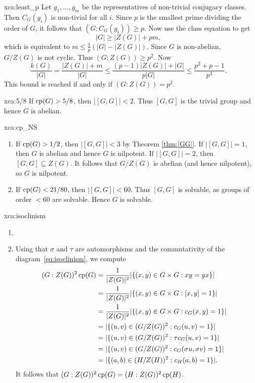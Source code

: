 \begin{sol}{xca:least_p}
Let $g_1,\dots,g_m$ be the representatives of non-trivial conjugacy classes. Then $C_G(g_i)$ is non-tivial for all $i$. Since $p$ is the smallest prime dividing the order of $G$, it follows that
$(G:C_G(g_i))\geq p$. Now use the class equation to get
\[
|G|\geq |Z(G)|+pm,
\]
which is equivalent to $m\leq \frac1p (|G|-|Z(G)|)$. Since $G$ is non-abelian, $G/Z(G)$ is not cyclic. Thus $(G:Z(G))\geq p^2$. Now 
\[
\frac{k(G)}{|G|}=\frac{|Z(G)|+m}{|G|}\leq \frac{(p-1)|Z(G)|+|G|}{p|G|}\leq \frac{p^2+p-1}{p^3}.
\]
This bound is reached if and only if $(G:Z(G))=p^2$.  
\end{sol}


\begin{sol}{xca:5/8}
    If $\operatorname{cp}(G)>5/8$, then $|[G,G]|<2$. Thus $[G,G]$ is the trivial group
    and hence $G$ is abelian. 
\end{sol}

\begin{sol}{xca:cp_NS}\
\begin{enumerate}
    \item If $\operatorname{cp}(G)>1/2$, then $|[G,G]|<3$ by Theorem \ref{thm:[GG]}. If $|[G,G]|=1$, 
    then $G$ is abelian and hence $G$ is nilpotent. If $|[G,G]|=2$, then 
    $[G,G]\subseteq Z(G)$. 
    It follows that 
    $G/Z(G)$ is abelian (and hence nilpotent), so $G$ is nilpotent. 
    \item If $\operatorname{cp}(G)<21/80$, then 
    $|[G,G]|<60$. Thus $[G,G]$ is solvable, as groups of order $<60$ are solvable. 
    Hence $G$ is solvable. 
\end{enumerate}
\end{sol}


\begin{sol}{xca:isoclinism}\
\begin{enumerate}
    \item 
    \item Using that $\sigma$ and 
    $\tau$ are automorphisms and 
    the commutativity of the diagram~\eqref{eq:isoclinism}, 
    we compute 
    \begin{align*}
        (G:Z(G))^2\operatorname{cp}(G) &= \frac{1}{|Z(G)|^2}|\{(x,y)\in G\times G:xy=yx\}|\\
        &=\frac{1}{|Z(G)|^2}|\{(x,y)\in G\times G:[x,y]=1\}|\\
        &=\frac{1}{|Z(G)|^2}|\{(x,y)\in G\times G:c_G(x,y)=1\}|\\
        &=|\{(u,v)\in (G/Z(G))^2:c_G(u,v)=1\}|\\
        &=|\{(u,v)\in (G/Z(G))^2:\tau c_G(u,v)=1\}|\\
        &=|\{(u,v)\in (G/Z(G))^2:c_G(\sigma u,\sigma v)=1\}|\\
        &=|\{(a,b)\in (H/Z(H))^2:c_H(a,b)=1\}|.
    \end{align*}
    It follows that $(G:Z(G))^2\operatorname{cp}(G)=(H:Z(G))^2\operatorname{cp}(H)$. 
\end{enumerate}
\end{sol}


